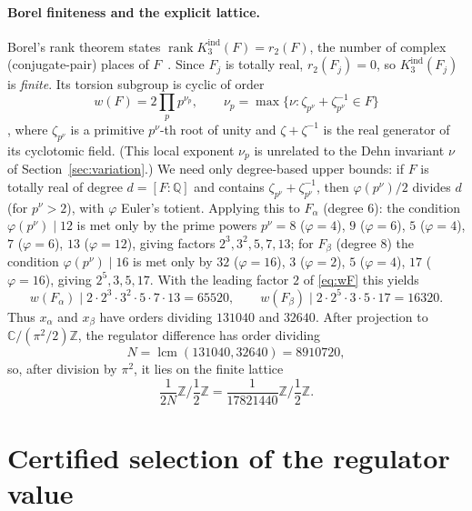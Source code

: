 \documentclass[11pt]{article}
\theoremstyle{definition}
\newcommand{\C}{\mathbb{C}}
\newcommand{\Q}{\mathbb{Q}}
\newcommand{\Z}{\mathbb{Z}}
\newcommand{\Kind}{K_3^{\mathrm{ind}}}
\begin{document}
\paragraph{Borel finiteness and the explicit lattice.}
Borel's rank theorem states $\operatorname{rank}\Kind(F)=r_2(F)$, the number of
complex (conjugate-pair) places of $F$~\cite{Borel}.  Since $F_j$ is totally
real, $r_2(F_j)=0$, so $\Kind(F_j)$ is \emph{finite}.  Its torsion subgroup is
cyclic of order
\begin{equation}\label{eq:wF}
 w(F)=2\prod_p p^{\nu_p},\qquad
 \nu_p=\max\{\nu:\zeta_{p^\nu}+\zeta_{p^\nu}^{-1}\in F\}
\end{equation}
\cite[Section~1]{ZickertK3}, where $\zeta_{p^\nu}$ is a primitive $p^\nu$-th root
of unity and $\zeta+\zeta^{-1}$ is the real generator of its cyclotomic field.
(This local exponent $\nu_p$ is unrelated to the Dehn invariant $\nu$ of
Section~\ref{sec:variation}.)  We need only degree-based upper bounds: if $F$ is
totally real of degree $d=[F:\Q]$ and contains $\zeta_{p^\nu}+\zeta_{p^\nu}^{-1}$,
then $\varphi(p^\nu)/2$ divides $d$ (for $p^\nu>2$), with $\varphi$ Euler's
totient.  Applying this to $F_\alpha$ (degree $6$): the condition
$\varphi(p^\nu)\mid12$ is met only by the prime powers $p^\nu=8$
($\varphi=4$), $9$ ($\varphi=6$), $5$ ($\varphi=4$), $7$ ($\varphi=6$),
$13$ ($\varphi=12$), giving factors $2^3,3^2,5,7,13$; for $F_\beta$ (degree
$8$) the condition $\varphi(p^\nu)\mid16$ is met only by $32$ ($\varphi=16$),
$3$ ($\varphi=2$), $5$ ($\varphi=4$), $17$ ($\varphi=16$), giving
$2^5,3,5,17$.  With the leading factor $2$ of \eqref{eq:wF} this yields
\begin{equation}\label{eq:w-bounds}
 w(F_\alpha)\mid 2\cdot2^3\cdot3^2\cdot5\cdot7\cdot13=65520,
 \qquad
 w(F_\beta)\mid 2\cdot2^5\cdot3\cdot5\cdot17=16320.
\end{equation}
Thus $x_\alpha$ and $x_\beta$ have orders dividing $131040$ and $32640$.  After
projection to $\C/(\pi^2/2)\Z$, the regulator difference has order dividing
\[
 N=\operatorname{lcm}(131040,32640)=8910720,
\]
so, after division by $\pi^2$, it lies on the finite lattice
\begin{equation}\label{eq:lattice}
 \frac{1}{2N}\Z\bigg/\frac12\Z
 =\frac{1}{17821440}\Z\bigg/\frac12\Z.
\end{equation}

\section{Certified selection of the regulator value}\label{sec:interval}
\end{document}

